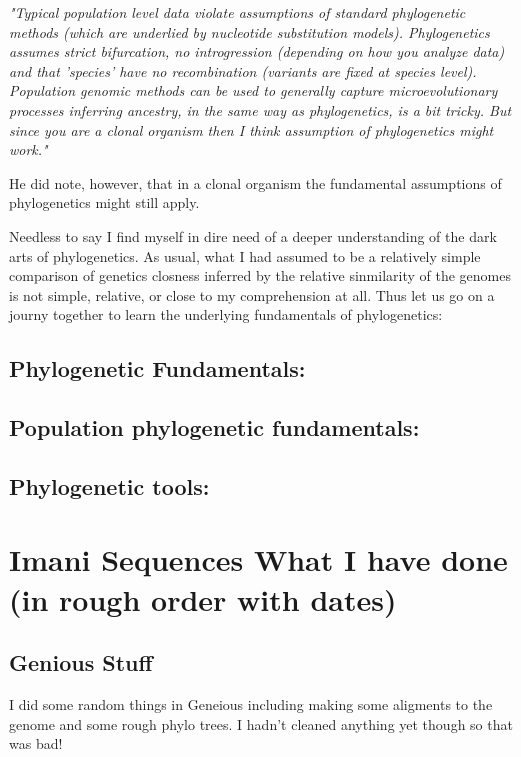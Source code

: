 \documentclass{article}
\begin{document}
    \textit{"Typical population level data violate assumptions of standard phylogenetic methods (which are underlied by nucleotide substitution models). Phylogenetics assumes strict bifurcation, no introgression (depending on how you analyze data) and that 'species' have no recombination (variants are fixed at species level).  Population genomic methods can be used to generally capture microevolutionary processes inferring ancestry, in the same way as phylogenetics, is a bit tricky.  But since you are a clonal organism then I think assumption of phylogenetics might work."}

    He did note, however, that in a clonal organism the fundamental assumptions of phylogenetics might still apply.

    Needless to say I find myself in dire need of a deeper understanding of the dark arts of phylogenetics.   As usual, what I had assumed to be a relatively simple comparison of genetics closness inferred by the relative sinmilarity of the genomes is not simple, relative, or close to my comprehension at all.   Thus let us go on a journy together to learn the underlying fundamentals of phylogenetics:

    \subsection{Phylogenetic Fundamentals:}

    \subsection{Population phylogenetic fundamentals:}

    \subsection{Phylogenetic tools:}



    \newpage
    \section{Imani Sequences What I have done (in rough order with dates)}
        \subsection{Genious Stuff}
        
        I did some random things in Geneious including making some aligments to the genome and some rough phylo trees.   I hadn't cleaned anything yet though so that was bad!   
\end{document}
